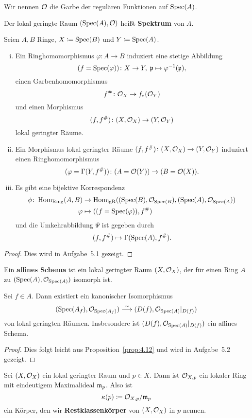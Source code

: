 \begin{bem*}
	Wir nennen $\mathcal{O}$ die Garbe der regulären Funktionen auf $\operatorname{Spec}(A)$.
\end{bem*}

\begin{defn}
	Der lokal geringte Raum $(\operatorname{Spec}(A), \mathcal{O})$ heißt \textbf{Spektrum} von $A$.
\end{defn}

\begin{prop}
	Seien $A, B$ Ringe, $X \coloneqq \operatorname{Spec}(B)$ und $Y \coloneqq \operatorname{Spec}(A)$.
	\begin{enumerate}[i)]
		\item Ein Ringhomomorphismus $\varphi\colon A \to B$ induziert eine stetige Abbildung
		\[
			(f = \operatorname{Spec}(\varphi))\colon X \to Y,\; \mathfrak{p} \mapsto \varphi^{-1}(\mathfrak{p}),
		\]
		einen Garbenhomomorphismus
		\[
			f^{\#}\colon \mathcal{O}_X \to f_*(\mathcal{O}_Y)
		\]
		und einen Morphismus
		\[
			(f,f^{\#})\colon (X,\mathcal{O}_X)\to (Y,\mathcal{O}_Y)
		\]
		lokal geringter Räume.
		\item Ein Morphismus lokal geringter Räume $(f,f^{\#})\colon (X,\mathcal{O}_X)\to(Y,\mathcal{O}_Y)$ induziert einen Ringhomomorphismus
		\[
			(\varphi = \Gamma(Y,f^{\#}))\colon (A = \mathcal{O}(Y)) \to (B=\mathcal{O}(X)).
		\]
		\item Es gibt eine bijektive Korrespondenz
		\begin{align*}
			\phi\colon \operatorname{Hom}_{\operatorname{Ring}}(A,B) &\to \operatorname{Hom}_{\operatorname{lgR}}((\operatorname{Spec}(B),\mathcal{O}_{\operatorname{Spec}(B}),(\operatorname{Spec}(A),\mathcal{O}_{\operatorname{Spec}(A}))\\
			\varphi & \mapsto ((f=\operatorname{Spec}(\varphi)),f^{\#})
		\end{align*}
		und die Umkehrabbildung $\Psi$ ist gegeben durch
		\[
			(f,f^{\#})\mapsto \Gamma(\operatorname{Spec}(A),f^{\#}).
		\]
	\end{enumerate}
	\begin{proof}
		Dies wird in Aufgabe~5.1 gezeigt.
	\end{proof}
\end{prop}

\begin{defn}
	Ein \textbf{affines Schema} ist ein lokal geringter Raum $(X,\mathcal{O}_X)$, der für einen Ring $A$ zu $(\operatorname{Spec}(A),\mathcal{O}_{\operatorname{Spec}(A)})$ isomorph ist.
\end{defn}

\begin{lem}
\label{lem:4.16}
	Sei $f \in A$. Dann existiert ein kanonischer Isomorphismus
	\[
		(\operatorname{Spec}(A_f),\mathcal{O}_{\operatorname{Spec}(A_f)}) \overset{\sim}{\longrightarrow} (D(f),\mathcal{O}_{\operatorname{Spec}(A)}\vert_{D(f)})
	\]
	von lokal geringten Räumen. Insbesondere ist $(D(f),\mathcal{O}_{\operatorname{Spec}(A)}\vert_{D(f)})$ ein affines Schema.
	\begin{proof}
		Dies folgt leicht aus Proposition~\ref{prop:4.12} und wird in Aufgabe~5.2 gezeigt.
	\end{proof}
\end{lem}

\begin{defn}
	Sei $(X,\mathcal{O}_X)$ ein lokal geringter Raum und $p \in X$. Dann ist $\mathcal{O}_{X,p}$ ein lokaler Ring mit eindeutigem Maximalideal $\mathfrak{m}_p$. Also ist
	\[
		\kappa(p) \coloneqq \mathcal{O}_{X,p}/\mathfrak{m}_p
	\]
	ein Körper, den wir \textbf{Restklassenkörper} von $(X,\mathcal{O}_X)$ in $p$ nennen.
\end{defn}
